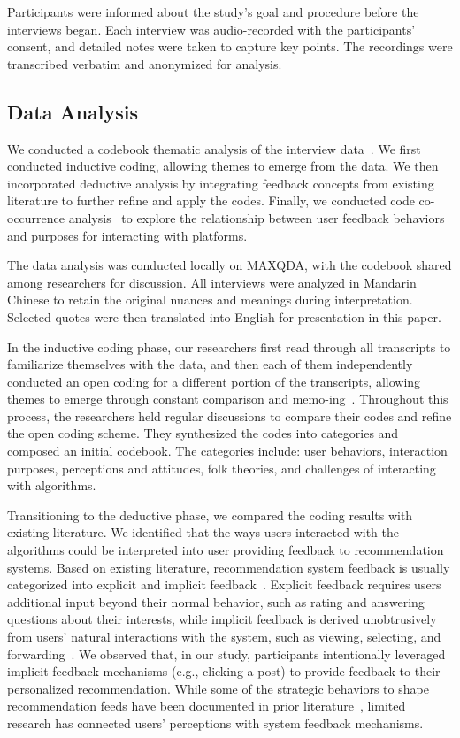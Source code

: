 Participants were informed about the study's goal and procedure before the interviews began. Each interview was audio-recorded with the participants' consent, and detailed notes were taken to capture key points. The recordings were transcribed verbatim and anonymized for analysis. 

\subsection{Data Analysis}
We conducted a codebook thematic analysis of the interview data~\cite{braun_thematic_2019,emeline_brule_thematic_2020}. We first conducted inductive coding, allowing themes to emerge from the data. We then incorporated deductive analysis by integrating feedback concepts from existing literature to further refine and apply the codes. Finally, we conducted code co-occurrence analysis~\cite{namey2008data} to explore the relationship between user feedback behaviors and purposes for interacting with platforms.

The data analysis was conducted locally on MAXQDA, with the codebook shared among researchers for discussion. All interviews were analyzed in Mandarin Chinese to retain the original nuances and meanings during interpretation. Selected quotes were then translated into English for presentation in this paper. 

In the inductive coding phase, our researchers first read through all transcripts to familiarize themselves with the data, and then each of them independently conducted an open coding for a different portion of the transcripts, allowing themes to emerge through constant comparison and memo-ing~\cite{miles1994qualitative}. Throughout this process, the researchers held regular discussions to compare their codes and refine the open coding scheme. They synthesized the codes into categories and composed an initial codebook. The categories include: user behaviors, interaction purposes, perceptions and attitudes, folk theories, and challenges of interacting with algorithms.

Transitioning to the deductive phase, we compared the coding results with existing literature. We identified that the ways users interacted with the algorithms could be interpreted into user providing feedback to recommendation systems. Based on existing literature, recommendation system feedback is usually categorized into explicit and implicit feedback~\cite{jannach2018recommending,jawaheer2014modeling,kelly2003implicit}. Explicit feedback requires users additional input beyond their normal behavior, such as rating and answering questions about their interests, while implicit feedback is derived unobtrusively from users' natural interactions with the system, such as viewing, selecting, and forwarding~\cite{kelly2003implicit}. We observed that, in our study, participants intentionally leveraged implicit feedback mechanisms (e.g., clicking a post) to provide feedback to their personalized recommendation. While some of the strategic behaviors to shape recommendation feeds have been documented in prior literature~\cite{Cen_Ilyas_Allen_Li_Madry_2024}, limited research has connected users' perceptions with system feedback mechanisms. 

